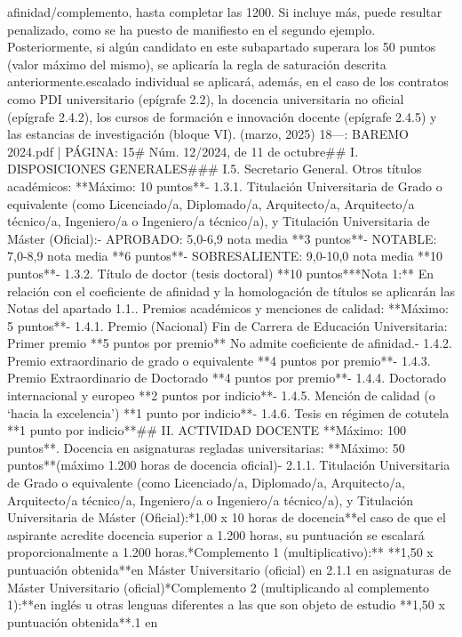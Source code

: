 \documentclass{article}
\begin{document}
\begin{itemize}
{{{afinidad/complemento, hasta completar las 1200. Si incluye más, puede resultar penalizado, como se ha puesto de manifiesto en el segundo ejemplo. Posteriormente, si algún candidato en este subapartado superara los 50 puntos (valor máximo del mismo), se aplicaría la regla de saturación descrita anteriormente.\n\nEl escalado individual se aplicará, además, en el caso de los contratos como PDI universitario (epígrafe 2.2), la docencia universitaria no oficial (epígrafe 2.4.2), los cursos de formación e innovación docente (epígrafe 2.4.5) y las estancias de investigación (bloque VI).\n{} (marzo, 2025) 18\n\n---\n\nFUENTE: BAREMO 2024.pdf | PÁGINA: 15\n# Núm. 12/2024, de 11 de octubre\n\n## I. DISPOSICIONES GENERALES\n\n### I.5. Secretario General\n{}. Otros títulos académicos:                                                            **Máximo: 10 puntos**\n- 1.3.1. Titulación Universitaria de Grado o equivalente (como Licenciado/a, Diplomado/a, Arquitecto/a, Arquitecto/a técnico/a, Ingeniero/a o Ingeniero/a técnico/a), y Titulación Universitaria de Máster (Oficial):\n- APROBADO: 5,0-6,9 nota media                            **3 puntos**\n- NOTABLE: 7,0-8,9 nota media                             **6 puntos**\n- SOBRESALIENTE: 9,0-10,0 nota media                      **10 puntos**\n- 1.3.2. Título de doctor (tesis doctoral)                  **10 puntos**\n\n**Nota 1:** En relación con el coeficiente de afinidad y la homologación de títulos se aplicarán las Notas del apartado 1.1.\n{}. Premios académicos y menciones de calidad:                                           **Máximo: 5 puntos**\n- 1.4.1. Premio (Nacional) Fin de Carrera de Educación Universitaria: Primer premio           **5 puntos por premio**           No admite coeficiente de afinidad.\n- 1.4.2. Premio extraordinario de grado o equivalente        **4 puntos por premio**\n- 1.4.3. Premio Extraordinario de Doctorado                  **4 puntos por premio**\n- 1.4.4. Doctorado internacional y europeo                   **2 puntos por indicio**\n- 1.4.5. Mención de calidad (o ‘hacia la excelencia’)        **1 punto por indicio**\n- 1.4.6. Tesis en régimen de cotutela                        **1 punto por indicio**\n\n## II. ACTIVIDAD DOCENTE                                                                     **Máximo: 100 puntos**\n{}. Docencia en asignaturas regladas universitarias:                                     **Máximo: 50 puntos**\n(máximo 1.200 horas de docencia oficial)\n- 2.1.1. Titulación Universitaria de Grado o equivalente (como Licenciado/a, Diplomado/a, Arquitecto/a, Arquitecto/a técnico/a, Ingeniero/a o Ingeniero/a técnico/a), y Titulación Universitaria de Máster (Oficial):\n**1,00 x 10 horas de docencia**\nEn el caso de que el aspirante acredite docencia superior a 1.200 horas, su puntuación se escalará proporcionalmente a 1.200 horas.\n\n**Complemento 1 (multiplicativo):**                             **1,50 x puntuación obtenida**\nDocencia en Máster Universitario (oficial)                  en 2.1.1 en asignaturas de Máster Universitario (oficial)\n\n**Complemento 2 (multiplicando al complemento 1):**\nDocencia en inglés u otras lenguas diferentes a las que son objeto de estudio                                      **1,50 x puntuación obtenida**.1 en }}}
\end{itemize}
\end{document}
